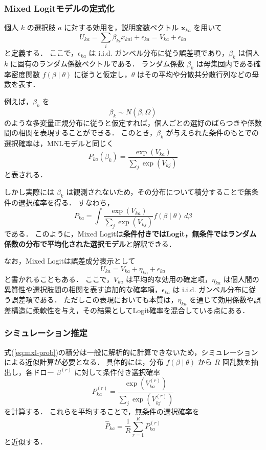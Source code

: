 \subsubsection{Mixed Logitモデルの定式化}
個人 $k$ の選択肢 $a$ に対する効用を，説明変数ベクトル $\bm{x}_{ka}$ を用いて
\begin{equation}
  U_{ka} = \sum_i \beta_{ki} x_{kai} + \epsilon_{ka} = V_{ka} + \epsilon_{ka}
\end{equation}
と定義する．
ここで，$\epsilon_{ka}$ は i.i.d. ガンベル分布に従う誤差項であり，$\beta_k$ は個人 $k$ に固有のランダム係数ベクトルである．
ランダム係数 $\beta_k$ は母集団内である確率密度関数 $f(\beta \mid \theta)$ に従うと仮定し，$\theta$ はその平均や分散共分散行列などの母数を表す．

例えば，$\beta_k$ を
\[
\beta_k \sim N(\bar{\beta}, \Omega)
\]
のような多変量正規分布に従うと仮定すれば，個人ごとの選好のばらつきや係数間の相関を表現することができる．
このとき，$\beta_k$ が与えられた条件のもとでの選択確率は，MNLモデルと同じく
\begin{equation}
  P_{ka}(\beta_k) = \frac{\exp(V_{ka})}{\displaystyle\sum_{j}\exp(V_{kj})}
\end{equation}
と表される． 

しかし実際には $\beta_k$ は観測されないため，その分布について積分することで無条件の選択確率を得る．
すなわち，
\begin{equation}\label{eq:mxl-prob}
  P_{ka} = \int \frac{\exp(V_{ka})}
  {\displaystyle\sum_{j}\exp(V_{kj})}
  f(\beta \mid \theta)\, d\beta
\end{equation}
である．
このように，Mixed Logitは\textbf{条件付きではLogit，無条件ではランダム係数の分布で平均化された選択モデル}と解釈できる．

なお，Mixed Logitは誤差成分表示として
\begin{equation}
  U_{ka} = V_{ka} + \eta_{ka} + \epsilon_{ka}
\end{equation}
と書かれることもある．
ここで，$V_{ka}$ は平均的な効用の確定項，$\eta_{ka}$ は個人間の異質性や選択肢間の相関を表す追加的な確率項，$\epsilon_{ka}$ は i.i.d. ガンベル分布に従う誤差項である．
ただしこの表現においても本質は，$\eta_{ka}$ を通じて効用係数や誤差構造に柔軟性を与え，その結果としてLogit確率を混合している点にある．

\subsubsection{シミュレーション推定}
式(\ref{eq:mxl-prob})の積分は一般に解析的に計算できないため，シミュレーションによる近似計算が必要となる．
具体的には，分布 $f(\beta \mid \theta)$ から $R$ 回乱数を抽出し，各ドロー $\beta^{(r)}$ に対して条件付き選択確率
\begin{equation}
  P_{ka}^{(r)}
  =
  \frac{\exp\!\left(V_{ka}^{(r)}\right)}
  {\displaystyle\sum_j \exp\!\left(V_{kj}^{(r)}\right)}
\end{equation}
を計算する．
これらを平均することで，無条件の選択確率を
\begin{equation}
  \hat{P}_{ka}
  =
  \frac{1}{R}\sum_{r=1}^{R} P_{ka}^{(r)}
\end{equation}
と近似する．

